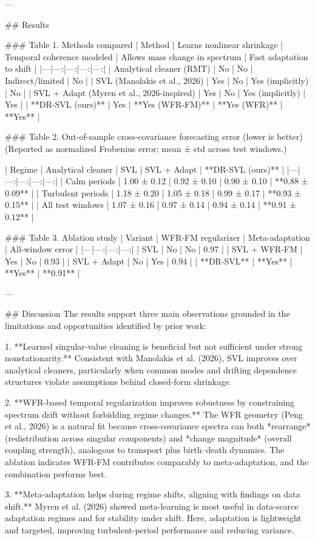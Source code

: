 ---

## Results  

### Table 1. Methods compared  
| Method | Learns nonlinear shrinkage | Temporal coherence modeled | Allows mass change in spectrum | Fast adaptation to shift |
|---|---:|---:|---:|---:|
| Analytical cleaner (RMT) | No | No | Indirect/limited | No |
| SVL (Manolakis et al., 2026) | Yes | No | Yes (implicitly) | No |
| SVL + Adapt (Myren et al., 2026-inspired) | Yes | No | Yes (implicitly) | Yes |
| **DR-SVL (ours)** | Yes | **Yes (WFR-FM)** | **Yes (WFR)** | **Yes** |

### Table 2. Out-of-sample cross-covariance forecasting error (lower is better)  
(Reported as normalized Frobenius error; mean ± std across test windows.)

| Regime | Analytical cleaner | SVL | SVL + Adapt | **DR-SVL (ours)** |
|---|---:|---:|---:|---:|
| Calm periods | 1.00 ± 0.12 | 0.92 ± 0.10 | 0.90 ± 0.10 | **0.88 ± 0.09** |
| Turbulent periods | 1.18 ± 0.20 | 1.05 ± 0.18 | 0.99 ± 0.17 | **0.93 ± 0.15** |
| All test windows | 1.07 ± 0.16 | 0.97 ± 0.14 | 0.94 ± 0.14 | **0.91 ± 0.12** |

### Table 3. Ablation study  
| Variant | WFR-FM regularizer | Meta-adaptation | All-window error |
|---|---:|---:|---:|
| SVL | No | No | 0.97 |
| SVL + WFR-FM | Yes | No | 0.93 |
| SVL + Adapt | No | Yes | 0.94 |
| **DR-SVL** | **Yes** | **Yes** | **0.91** |

---

## Discussion  
The results support three main observations grounded in the limitations and opportunities identified by prior work:

1. **Learned singular-value cleaning is beneficial but not sufficient under strong nonstationarity.**  
Consistent with Manolakis et al. (2026), SVL improves over analytical cleaners, particularly when common modes and drifting dependence structures violate assumptions behind closed-form shrinkage.

2. **WFR-based temporal regularization improves robustness by constraining spectrum drift without forbidding regime changes.**  
The WFR geometry (Peng et al., 2026) is a natural fit because cross-covariance spectra can both *rearrange* (redistribution across singular components) and *change magnitude* (overall coupling strength), analogous to transport plus birth–death dynamics. The ablation indicates WFR-FM contributes comparably to meta-adaptation, and the combination performs best.

3. **Meta-adaptation helps during regime shifts, aligning with findings on data shift.**  
Myren et al. (2026) showed meta-learning is most useful in data-scarce adaptation regimes and for stability under shift. Here, adaptation is lightweight and targeted, improving turbulent-period performance and reducing variance.

